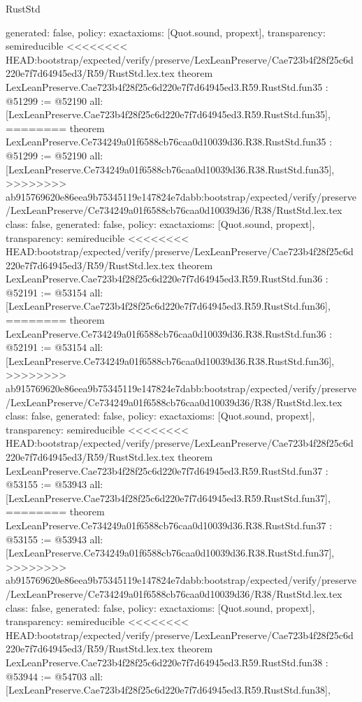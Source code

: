 \begin{lexlean}{RustStd}
\begin{coremodule}
{\begin{coremodule}
{{{{{{{{{{{{{{{{{{{{{{{{{{{{{{{{{{{{{{  generated: false,
  policy: exact{axioms: [Quot.sound, propext]},
  transparency: semireducible
}
<<<<<<<< HEAD:bootstrap/expected/verify/preserve/LexLeanPreserve/Cae723b4f28f25c6d220e7f7d64945ed3/R59/RustStd.lex.tex
theorem LexLeanPreserve.Cae723b4f28f25c6d220e7f7d64945ed3.R59.RustStd.fun35 : @51299 := @52190 {
  all: [LexLeanPreserve.Cae723b4f28f25c6d220e7f7d64945ed3.R59.RustStd.fun35],
========
theorem LexLeanPreserve.Ce734249a01f6588cb76caa0d10039d36.R38.RustStd.fun35 : @51299 := @52190 {
  all: [LexLeanPreserve.Ce734249a01f6588cb76caa0d10039d36.R38.RustStd.fun35],
>>>>>>>> ab915769620e86eea9b75345119e147824e7dabb:bootstrap/expected/verify/preserve/LexLeanPreserve/Ce734249a01f6588cb76caa0d10039d36/R38/RustStd.lex.tex
  class: false,
  generated: false,
  policy: exact{axioms: [Quot.sound, propext]},
  transparency: semireducible
}
<<<<<<<< HEAD:bootstrap/expected/verify/preserve/LexLeanPreserve/Cae723b4f28f25c6d220e7f7d64945ed3/R59/RustStd.lex.tex
theorem LexLeanPreserve.Cae723b4f28f25c6d220e7f7d64945ed3.R59.RustStd.fun36 : @52191 := @53154 {
  all: [LexLeanPreserve.Cae723b4f28f25c6d220e7f7d64945ed3.R59.RustStd.fun36],
========
theorem LexLeanPreserve.Ce734249a01f6588cb76caa0d10039d36.R38.RustStd.fun36 : @52191 := @53154 {
  all: [LexLeanPreserve.Ce734249a01f6588cb76caa0d10039d36.R38.RustStd.fun36],
>>>>>>>> ab915769620e86eea9b75345119e147824e7dabb:bootstrap/expected/verify/preserve/LexLeanPreserve/Ce734249a01f6588cb76caa0d10039d36/R38/RustStd.lex.tex
  class: false,
  generated: false,
  policy: exact{axioms: [Quot.sound, propext]},
  transparency: semireducible
}
<<<<<<<< HEAD:bootstrap/expected/verify/preserve/LexLeanPreserve/Cae723b4f28f25c6d220e7f7d64945ed3/R59/RustStd.lex.tex
theorem LexLeanPreserve.Cae723b4f28f25c6d220e7f7d64945ed3.R59.RustStd.fun37 : @53155 := @53943 {
  all: [LexLeanPreserve.Cae723b4f28f25c6d220e7f7d64945ed3.R59.RustStd.fun37],
========
theorem LexLeanPreserve.Ce734249a01f6588cb76caa0d10039d36.R38.RustStd.fun37 : @53155 := @53943 {
  all: [LexLeanPreserve.Ce734249a01f6588cb76caa0d10039d36.R38.RustStd.fun37],
>>>>>>>> ab915769620e86eea9b75345119e147824e7dabb:bootstrap/expected/verify/preserve/LexLeanPreserve/Ce734249a01f6588cb76caa0d10039d36/R38/RustStd.lex.tex
  class: false,
  generated: false,
  policy: exact{axioms: [Quot.sound, propext]},
  transparency: semireducible
}
<<<<<<<< HEAD:bootstrap/expected/verify/preserve/LexLeanPreserve/Cae723b4f28f25c6d220e7f7d64945ed3/R59/RustStd.lex.tex
theorem LexLeanPreserve.Cae723b4f28f25c6d220e7f7d64945ed3.R59.RustStd.fun38 : @53944 := @54703 {
  all: [LexLeanPreserve.Cae723b4f28f25c6d220e7f7d64945ed3.R59.RustStd.fun38],
}}}}}}}}}}}}}}}}}}}}}}}}}}}}}}}}}}}}}}}}}
\end{coremodule}}
\end{coremodule}
\end{lexlean}
